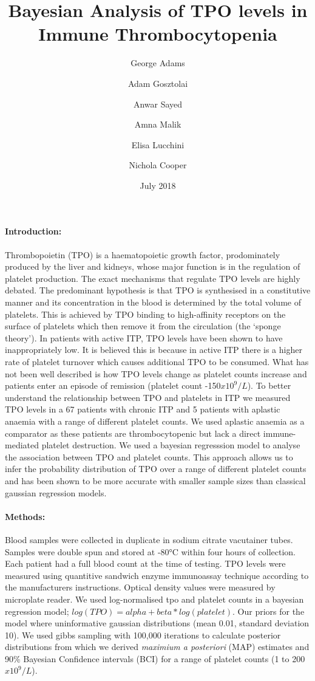 \documentclass[11pt]{article}
\title{Bayesian Analysis of TPO levels in Immune Thrombocytopenia}
\author[1,2]{\small George Adams}
\author[1]{\small Adam Gosztolai}
\author[1]{\small Anwar Sayed}
\author[1]{\small Amna Malik}
\author[1]{\small Elisa Lucchini}
\author[1,2]{\small Nichola Cooper}
\affil[1]{\footnotesize Imperial College London, Kensington, London SW7 2AZ}
\affil[2]{\footnotesize Hammersmith Hospital, Imperial College NHS Trust, London W12 0HS}
\date{July 2018}
\begin{document}
\maketitle

\paragraph{Introduction:} Thrombopoietin (TPO) is a haematopoietic growth factor, prodominately produced by the liver and kidneys, whose major function is in the regulation of platelet production. The exact mechanisms that regulate TPO levels are highly debated. The predominant hypothesis is that TPO is synthesised in a constitutive manner and its concentration in the blood is determined by the total volume of platelets. This is achieved by TPO binding to high-affinity receptors on the surface of platelets which then remove it from the circulation (the `sponge theory'). %
In patients with active ITP, TPO levels have been shown to have inappropriately low. It is believed this is because in active ITP there is a higher rate of platelet turnover which causes additional TPO to be consumed. What has not been well described is how TPO levels change as platelet counts increase and patients enter an episode of remission (platelet count -150$x10^9/L$). To better understand the relationship between TPO and platelets in ITP we measured TPO levels in a 67 patients with chronic ITP and 5 patients with aplastic anaemia with a range of different platelet counts. We used aplastic anaemia as a comparator as these patients are thrombocytopenic but lack a direct immune-mediated platelet destruction. We used a bayesian regresssion model to analyse the association between TPO and platelet counts. This approach allows us to infer the probability distribution of TPO over a range of different platelet counts and has been shown to be more accurate with smaller sample sizes than classical gaussian regression models. %


\paragraph{Methods:} Blood samples were collected in duplicate in sodium citrate vacutainer tubes. Samples were double spun and stored at -80°C within four hours of collection. Each patient had a full blood count at the time of testing. TPO levels were measured using quantitive sandwich enzyme immunoassay technique according to the manufacturers instructions. Optical density values were measured by microplate reader. We used log-normalised tpo and platelet counts in a bayesian regression model; $log(TPO) = alpha + beta*log(platelet)$. Our priors for the model where uninformative gaussian distributions (mean 0.01, standard deviation 10). We used gibbs sampling with 100,000 iterations to calculate posterior distributions from which we derived \textit{maximium a posteriori} (MAP) estimates and 90\% Bayesian Confidence intervals (BCI) for a range of platelet counts (1 to 200$x10^9/L$).
\end{document}
